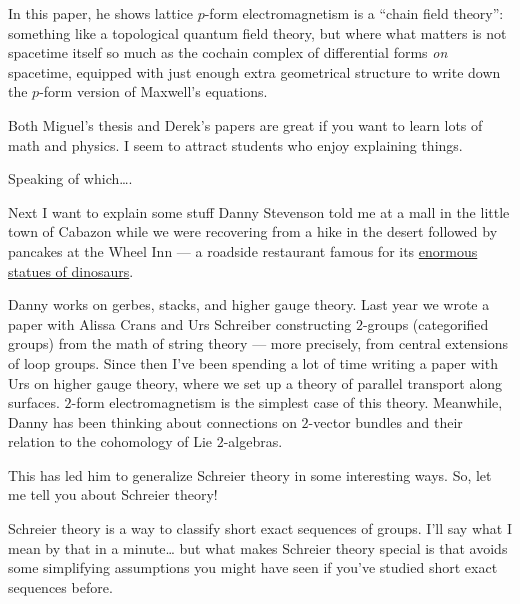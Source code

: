 \documentclass{article}
\def\tightlist{}
\renewcommand{\texttt}[1]{%
  \begingroup
  \ttfamily
  \begingroup\lccode`~=`/\lowercase{\endgroup\def~}{/\discretionary{}{}{}}%
  \begingroup\lccode`~=`[\lowercase{\endgroup\def~}{[\discretionary{}{}{}}%
  \begingroup\lccode`~=`.\lowercase{\endgroup\def~}{.\discretionary{}{}{}}%
  \catcode`/=\active\catcode`[=\active\catcode`.=\active
  \scantokens{#1\noexpand}%
  \endgroup
}
\begin{document}

In this paper, he shows lattice \(p\)-form electromagnetism is a ``chain
field theory'': something like a topological quantum field theory, but
where what matters is not spacetime itself so much as the cochain
complex of differential forms \emph{on} spacetime, equipped with just
enough extra geometrical structure to write down the \(p\)-form version
of Maxwell's equations.

Both Miguel's thesis and Derek's papers are great if you want to learn
lots of math and physics. I seem to attract students who enjoy
explaining things.

Speaking of which\ldots.

Next I want to explain some stuff Danny Stevenson told me at a mall in
the little town of Cabazon while we were recovering from a hike in the
desert followed by pancakes at the Wheel Inn --- a roadside restaurant
famous for its
\href{http://www.bigwaste.com/photos/ca/cabazon_dinos/}{enormous statues
of dinosaurs}.

Danny works on gerbes, stacks, and higher gauge theory. Last year we
wrote a paper with Alissa Crans and Urs Schreiber constructing
\(2\)-groups (categorified groups) from the math of string theory ---
more precisely, from central extensions of loop groups. Since then I've
been spending a lot of time writing a paper with Urs on higher gauge
theory, where we set up a theory of parallel transport along surfaces.
\(2\)-form electromagnetism is the simplest case of this theory.
Meanwhile, Danny has been thinking about connections on \(2\)-vector
bundles and their relation to the cohomology of Lie \(2\)-algebras.

This has led him to generalize Schreier theory in some interesting ways.
So, let me tell you about Schreier theory!

Schreier theory is a way to classify short exact sequences of groups.
I'll say what I mean by that in a minute\ldots{} but what makes Schreier
theory special is that avoids some simplifying assumptions you might
have seen if you've studied short exact sequences before.
\end{document}
